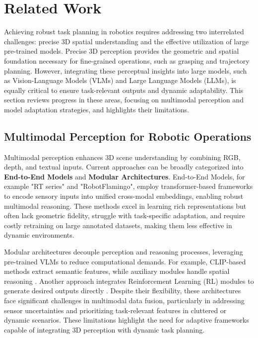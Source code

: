 \section{Related Work}
Achieving robust task planning in robotics requires addressing two interrelated challenges: precise 3D spatial understanding and the effective utilization of large pre-trained models. Precise 3D perception provides the geometric and spatial foundation necessary for fine-grained operations, such as grasping and trajectory planning. However, integrating these perceptual insights into large models, such as Vision-Language Models (VLMs) and Large Language Models (LLMs), is equally critical to ensure task-relevant outputs and dynamic adaptability. This section reviews progress in these areas, focusing on multimodal perception and model adaptation strategies, and highlights their limitations.
\subsection{Multimodal Perception for Robotic Operations}

Multimodal perception enhances 3D scene understanding by combining RGB, depth, and textual inputs. Current approaches can be broadly categorized into \textbf{End-to-End Models} and \textbf{Modular Architectures}. End-to-End Models, for example "RT series"\cite{ref25-rt1,ref26-rt2} and "RobotFlamingo"\cite{ref27-flamingo}, employ transformer-based frameworks to encode sensory inputs into unified cross-modal embeddings, enabling robust multimodal reasoning. These methods excel in learning rich representations but often lack geometric fidelity, struggle with task-specific adaptation, and require costly retraining on large annotated datasets, making them less effective in dynamic environments.

Modular architectures decouple perception and reasoning processes, leveraging pre-trained VLMs to reduce computational demands. For example, CLIP-based methods extract semantic features, while auxiliary modules handle spatial reasoning \cite{ref28-clipgrasp,ref29-clipFO3D}. Another approach integrates Reinforcement Learning (RL) modules to generate desired outputs directly \cite{ref30-surveyofModularLLMRL}. Despite their flexibility, these architectures face significant challenges in multimodal data fusion, particularly in addressing sensor uncertainties and prioritizing task-relevant features in cluttered or dynamic scenarios. These limitations highlight the need for adaptive frameworks capable of integrating 3D perception with dynamic task planning.


